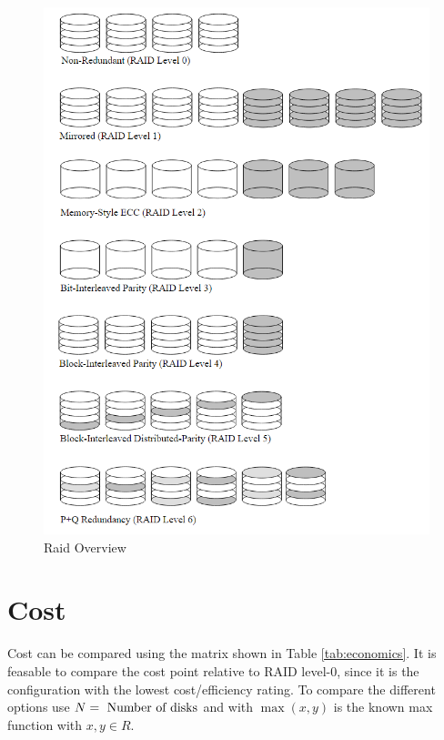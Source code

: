 \documentclass{article}
\begin{document}
\begin{figure}[h]
    \label{fig:raid-overview}
    \caption{Raid Overview \cite{cmu:raidhighperf}}
    \includegraphics[width=\textwidth]{raid-overview}
\end{figure}

\section{Cost}
Cost can be compared using the matrix shown in Table \ref{tab:economics}.
It is feasable to compare the cost point relative to RAID level-0, since it
is the configuration with the lowest cost/efficiency rating.
To compare the different options use \( N = \textnormal{ Number of disks}\)
and with \(\max\left(x,y\right)\) is the known max function with \( x, y \in R \). \cite{cmu:raidhighperf}
\end{document}
